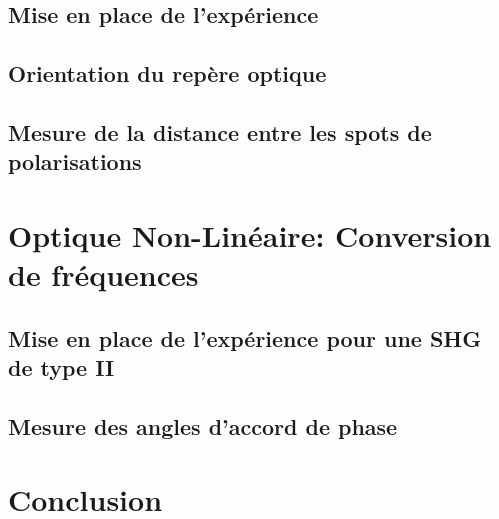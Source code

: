 \documentclass[a4paper,11pt]{report}
\begin{document}
\section{Mise en place de l'expérience}
\section{Orientation du repère optique}
\section{Mesure de la distance entre les spots de polarisations}

\chapter{Optique Non-Linéaire: Conversion de fréquences} \label{ONL}
\section{Mise en place de l'expérience pour une SHG de type II}
\section{Mesure des angles d'accord de phase}

\chapter*{Conclusion} 
\end{document}
